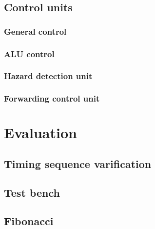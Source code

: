 \documentclass[11pt, a4paper, twoside]{IEEEtran}
\begin{document}
	\subsection{Control units}
		\subsubsection{General control}
		\subsubsection{ALU control}
		\subsubsection{Hazard detection unit}
		\subsubsection{Forwarding control unit}
\section{Evaluation}
	\subsection{Timing sequence varification}
	\subsection{Test bench}
	\subsection{Fibonacci}
\end{document}
